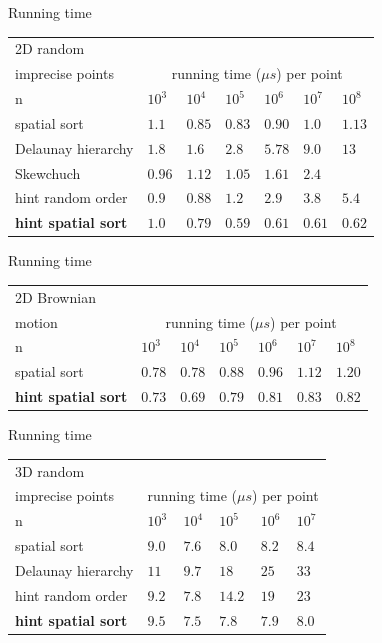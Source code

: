 \documentclass{beamer}
\begin{document}
\begin{frame}{Running time}
\begin{tabular}{|l||l|l|l|l|l|l|}
\hline
2D random \\
imprecise points & \multicolumn{6}{|c|}{running time  ($\mu s$) per point}\\
 \hline \hline
    n & $10^3$ & $10^4$ & $10^5$ & $10^6$ & $10^7$ & $10^8$\\\hline
    spatial sort & $1.1$ & $0.85 $ & $0.83 $ & $0.90 $ & $1.0 $ & $1.13$\\\hline
    Delaunay hierarchy & $1.8$ & $1.6$ & $2.8 $ & $5.78 $ & $9.0$ & $13$\\\hline
    Skewchuch & $0.96 $ & $1.12$ & $1.05 $ & $1.61 $ & $2.4$ &\\\hline
    hint random order & $0.9 $ & $0.88 $ & $1.2 $ & $2.9 $ & $3.8$ & $5.4$\\\hline
    \textbf{hint spatial sort} & $1.0 $ & $0.79$ & $0.59$ & $0.61 $ & $0.61 $ & $0.62$\\\hline
\end{tabular}
\end{frame}

\begin{frame}{Running time}
\begin{tabular}{|l||l|l|l|l|l|l|}
\hline
2D Brownian \\
motion & \multicolumn{6}{|c|}{running time  ($\mu s$) per point}\\
 \hline \hline
    n & $10^3$ & $10^4$ & $10^5$ & $10^6$ & $10^7$ & $10^8$ \\\hline
    spatial sort & $0.78$ & $0.78 $ & $0.88 $ & $0.96 $ & $1.12 $ & $1.20$\\\hline
    \textbf{hint spatial sort} & $0.73 $ & $0.69$ & $0.79$ & $0.81 $ & $0.83 $ & $0.82$\\
    \hline
\end{tabular}
\end{frame}

\begin{frame}{Running time}
\begin{tabular}{|l||l|l|l|l|l|}
\hline
3D random \\
imprecise points & \multicolumn{5}{|c|}{running time  ($\mu s$) per point}\\
 \hline \hline
    n & $10^3$ & $10^4$ & $10^5$ & $10^6$ & $10^7$ \\\hline
    spatial sort & $9.0$ & $7.6 $ & $8.0$ & $8.2$ & $8.4$\\\hline
    Delaunay hierarchy & $11$ & $9.7$ & $18$ & $25$ & $33$\\\hline
    hint random order & $9.2 $ & $7.8 $ & $14.2 $ & $19 $ & $23$ \\\hline
    \textbf{hint spatial sort} & $9.5$ & $7.5$ & $7.8$ & $7.9$ & $8.0$\\\hline
\end{tabular}
\end{frame}
\end{document}
